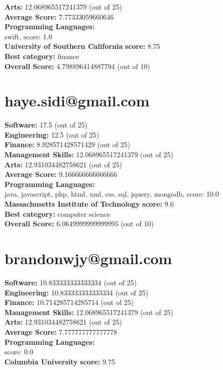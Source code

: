 \documentclass{article}
\begin{document}
\textbf{Arts:} 12.068965517241379 (out of 25)\\
\textbf{Average Score: } 7.77333059660646\\
\textbf{Programming Languages:} \\
swift, score: 1.0\\
\textbf{University of Southern California} \textbf{score:} 8.75\\
\textbf{Best category: } finance\\
\textbf{Overall Score: }4.798896414887794 (out of 10)\section{haye.sidi@gmail.com}
\textbf{Software:} 17.5 (out of 25)\\
\textbf{Engineering: } 12.5 (out of 25)\\
\textbf{Finance:} 8.928571428571429 (out of 25)\\
\textbf{Management Skills:} 12.068965517241379 (out of 25)\\
\textbf{Arts:} 12.931034482758621 (out of 25)\\
\textbf{Average Score: } 9.166666666666666\\
\textbf{Programming Languages:} \\
java, javascript, php, html, xml, css, sql, jquery, mongodb, score: 10.0\\
\textbf{Massachusetts Institute of Technology} \textbf{score:} 9.6\\
\textbf{Best category: } computer science\\
\textbf{Overall Score: }6.0649999999999995 (out of 10)\section{brandonwjy@gmail.com}
\textbf{Software:} 10.833333333333334 (out of 25)\\
\textbf{Engineering: } 10.833333333333334 (out of 25)\\
\textbf{Finance:} 10.714285714285714 (out of 25)\\
\textbf{Management Skills:} 12.068965517241379 (out of 25)\\
\textbf{Arts:} 12.931034482758621 (out of 25)\\
\textbf{Average Score: } 7.777777777777778\\
\textbf{Programming Languages:} \\
score: 0.0\\
\textbf{Columbia University} \textbf{score:} 9.75\\
\end{document}
